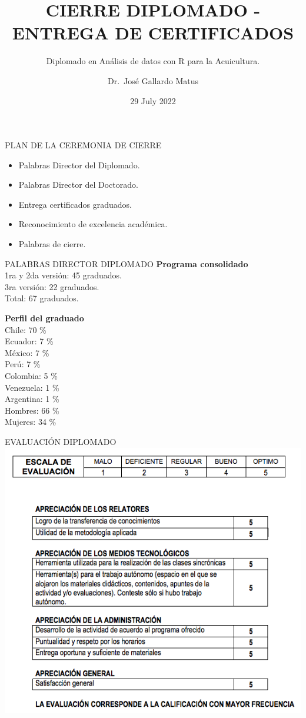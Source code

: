 \documentclass[
  ignorenonframetext,
]{beamer}
\title{CIERRE DIPLOMADO - ENTREGA DE CERTIFICADOS}
\subtitle{Diplomado en Análisis de datos con R para la Acuicultura.}
\author{Dr.~José Gallardo Matus}
\date{29 July 2022}
\institute{Pontificia Universidad Católica de Valparaíso}
\begin{document}
\frame{\titlepage}

\begin{frame}{PLAN DE LA CEREMONIA DE CIERRE}
\protect\hypertarget{plan-de-la-ceremonia-de-cierre}{}
\begin{itemize}
\item
  Palabras Director del Diplomado.
\item
  Palabras Director del Doctorado.
\item
  Entrega certificados graduados.
\item
  Reconocimiento de excelencia académica.
\item
  Palabras de cierre.
\end{itemize}
\end{frame}

\begin{frame}{PALABRAS DIRECTOR DIPLOMADO}
\protect\hypertarget{palabras-director-diplomado}{}
\textbf{Programa consolidado}\\
1ra y 2da versión: 45 graduados.\\
3ra versión: 22 graduados.\\
Total: 67 graduados.

\textbf{Perfil del graduado}\\
Chile: 70 \%\\
Ecuador: 7 \%\\
México: 7 \%\\
Perú: 7 \%\\
Colombia: 5 \%\\
Venezuela: 1 \%\\
Argentina: 1 \%\\
Hombres: 66 \%\\
Mujeres: 34 \%
\end{frame}

\begin{frame}{EVALUACIÓN DIPLOMADO}
\protect\hypertarget{evaluaciuxf3n-diplomado}{}
\includegraphics[width=0.6\linewidth]{Evaluacion}
\end{frame}
\end{document}

